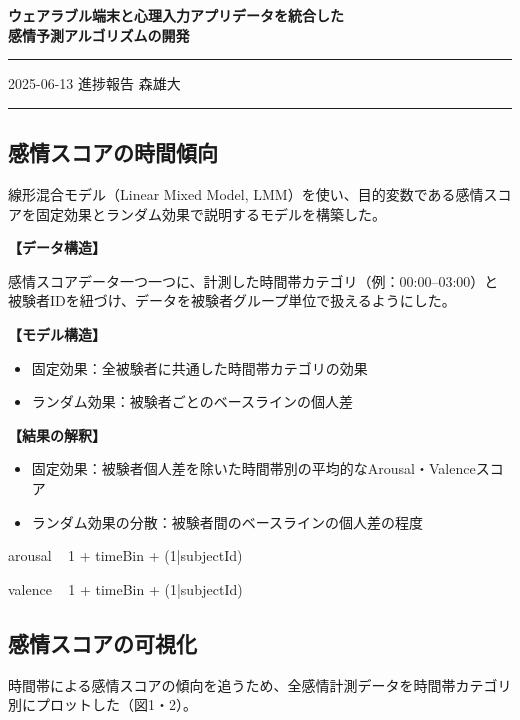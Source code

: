 \documentclass[a4paper,11pt]{article}
\begin{document}
\begin{center}
  {\LARGE \bfseries ウェアラブル端末と心理入力アプリデータを統合した\\感情予測アルゴリズムの開発}\\[6ex]
\end{center}

\hrule\vspace{1ex}
{\normalsize 2025-06-13 進捗報告 \hfill 森雄大}\\
\hrule\vspace{5ex}



\subsection*{感情スコアの時間傾向}
線形混合モデル（Linear Mixed Model, LMM）を使い、目的変数である感情スコアを固定効果とランダム効果で説明するモデルを構築した。

\vspace{2ex}
\noindent \textbf{【データ構造】}

感情スコアデータ一つ一つに、計測した時間帯カテゴリ（例：00:00–03:00）と被験者IDを紐づけ、データを被験者グループ単位で扱えるようにした。

\vspace{2ex}
\noindent \textbf{【モデル構造】}

\begin{itemize}
\item 固定効果：全被験者に共通した時間帯カテゴリの効果
\item ランダム効果：被験者ごとのベースラインの個人差
\end{itemize}

\vspace{2ex}
\noindent \textbf{【結果の解釈】}

\begin{itemize}
\item 固定効果：被験者個人差を除いた時間帯別の平均的なArousal・Valenceスコア
\item ランダム効果の分散：被験者間のベースラインの個人差の程度
\end{itemize}

arousal ~ 1 + timeBin + (1|subjectId)

valence ~ 1 + timeBin + (1|subjectId)


\subsection*{感情スコアの可視化}
時間帯による感情スコアの傾向を追うため、全感情計測データを時間帯カテゴリ別にプロットした（図1・2）。
\end{document}
